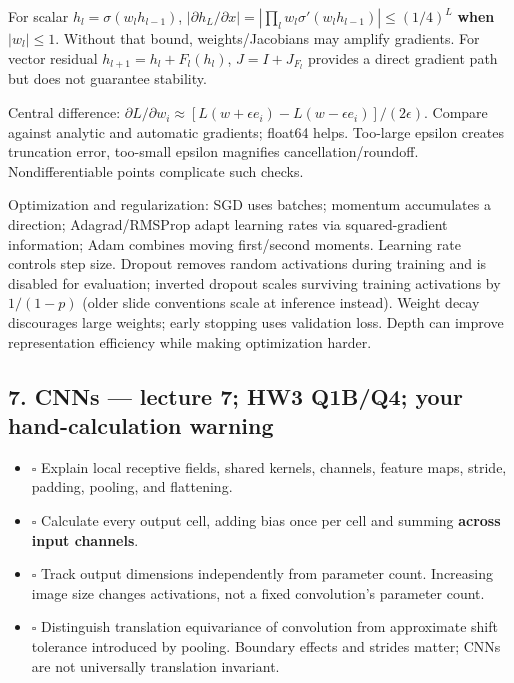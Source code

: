 \documentclass[11pt]{article}
\begin{document}
For scalar $h_l=\sigma(w_lh_{l-1})$, $|\partial h_L/\partial x|=|\prod_l w_l\sigma'(w_lh_{l-1})|\le(1/4)^L$ \textbf{when} $|w_l|\le1$. Without that bound, weights/\allowbreak{}Jacobians may amplify gradients. For vector residual $h_{l+1}=h_l+F_l(h_l)$, $J=I+J_{F_l}$ provides a direct gradient path but does not guarantee stability.

Central difference: $\partial L/\partial w_i\approx[L(w+\epsilon e_i)-L(w-\epsilon e_i)]/(2\epsilon)$. Compare against analytic and automatic gradients; float64 helps. Too-large epsilon creates truncation error, too-small epsilon magnifies cancellation/\allowbreak{}roundoff. Nondifferentiable points complicate such checks.

Optimization and regularization: SGD uses batches; momentum accumulates a direction; Adagrad/\allowbreak{}RMSProp adapt learning rates via squared-gradient information; Adam combines moving first/\allowbreak{}second moments. Learning rate controls step size. Dropout removes random activations during training and is disabled for evaluation; inverted dropout scales surviving training activations by $1/(1-p)$ (older slide conventions scale at inference instead). Weight decay discourages large weights; early stopping uses validation loss. Depth can improve representation efficiency while making optimization harder.

\subsection*{7. CNNs — lecture 7; HW3 Q1B/\allowbreak{}Q4; your hand-calculation warning}

\begin{itemize}
\item \(\square\) Explain local receptive fields, shared kernels, channels, feature maps, stride, padding, pooling, and flattening.
\item \(\square\) Calculate every output cell, adding bias once per cell and summing \textbf{across input channels}.
\item \(\square\) Track output dimensions independently from parameter count. Increasing image size changes activations, not a fixed convolution's parameter count.
\item \(\square\) Distinguish translation equivariance of convolution from approximate shift tolerance introduced by pooling. Boundary effects and strides matter; CNNs are not universally translation invariant.
\end{itemize}
\end{document}
